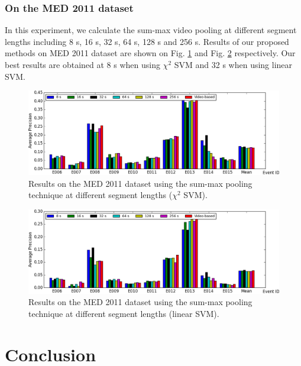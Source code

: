 \subsubsection{On the MED 2011 dataset}

In this experiment, we calculate the sum-max video pooling at different segment lengths including 8 s, 16 s, 32 s, 64 s, 128 s and 256 s. Results of our proposed methods on MED 2011 dataset are shown on Fig. \ref{f_med11_summax_kernel} and Fig. \ref{f_med11_summax_linear} respectively. Our best results are obtained at 8 s when using ${\chi}^2$ SVM and 32 s when using linear SVM.

\begin{figure}[!htb]
	\centering
	\includegraphics[width=1\textwidth]{med11_summax_kernel.png}
	\caption{Results on the MED 2011 dataset using the sum-max pooling technique at different segment lengths (${\chi}^2$ SVM).}
	\label{f_med11_summax_kernel}
\end{figure}

\begin{figure}[!htb]
	\centering
	\includegraphics[width=1\textwidth]{med11_summax_linear.png}
	\caption{Results on the MED 2011 dataset using the sum-max pooling technique at different segment lengths (linear SVM).}
	\label{f_med11_summax_linear}
\end{figure}


\section{Conclusion}
\label{sec:majhead}

